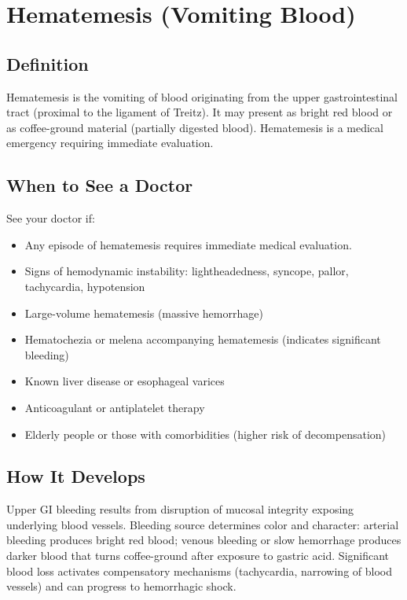 \chapter{Hematemesis (Vomiting Blood)}

\section*{Definition}
Hematemesis is the vomiting of blood originating from the upper gastrointestinal tract (proximal to the ligament of Treitz). It may present as bright red blood or as coffee-ground material (partially digested blood). Hematemesis is a medical emergency requiring immediate evaluation.

\section*{When to See a Doctor}
See your doctor if:
\begin{itemize}
  \item Any episode of hematemesis requires immediate medical evaluation.
  \item Signs of hemodynamic instability: lightheadedness, syncope, pallor, tachycardia, hypotension
  \item Large-volume hematemesis (massive hemorrhage)
  \item Hematochezia or melena accompanying hematemesis (indicates significant bleeding)
  \item Known liver disease or esophageal varices
  \item Anticoagulant or antiplatelet therapy
  \item Elderly people or those with comorbidities (higher risk of decompensation)
\end{itemize}

\section*{How It Develops}
Upper GI bleeding results from disruption of mucosal integrity exposing underlying blood vessels. Bleeding source determines color and character: arterial bleeding produces bright red blood; venous bleeding or slow hemorrhage produces darker blood that turns coffee-ground after exposure to gastric acid. Significant blood loss activates compensatory mechanisms (tachycardia, narrowing of blood vessels) and can progress to hemorrhagic shock.

